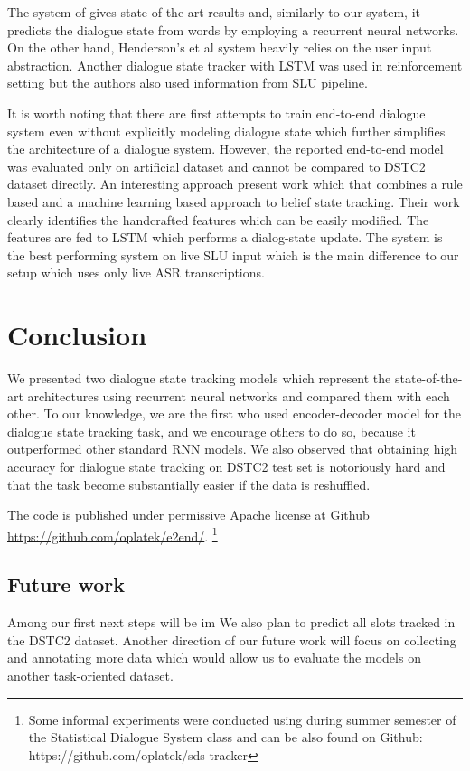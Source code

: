 \documentclass{itatnew}
\begin{document}
The system of \cite{henderson2014word} gives state-of-the-art results and, similarly to our system, it predicts the dialogue state from words by employing a recurrent neural networks.
On the other hand, Henderson's et al system heavily relies on the user input abstraction.
Another dialogue state tracker with LSTM was used in reinforcement setting but the authors also used information from SLU pipeline.\cite{lee2016dialog}

It is worth noting that there are first attempts to train end-to-end dialogue system even without explicitly modeling dialogue state\cite{bordes2016learning} which further simplifies the architecture of a dialogue system.
However, the reported end-to-end model was evaluated only on artificial dataset and cannot be compared to DSTC2 dataset directly.
An interesting approach present work\cite{vodolan2015hybrid} which that combines a rule based and a machine learning based approach to belief state tracking.
Their work clearly identifies the handcrafted features which can be easily modified. The features are fed to LSTM which performs a dialog-state update.
The system is the best performing system on live SLU input which is the main difference to our setup which uses only live ASR transcriptions.

\section{Conclusion}
\label{sec:conc}

We presented two dialogue state tracking models which represent the state-of-the-art architectures using recurrent neural networks and compared them with each other.
To our knowledge, we are the first who used encoder-decoder model for the dialogue state tracking task, and we encourage others to do so, because it outperformed other standard RNN models.
We also observed that obtaining high accuracy for dialogue state tracking on DSTC2 test set is notoriously hard and that the task become substantially easier if the data is reshuffled.

The code is published under permissive Apache license at Github \url{https://github.com/oplatek/e2end/}. \footnote{Some informal experiments were conducted using during summer semester of the Statistical Dialogue System class and can be also found on Github: https://github.com/oplatek/sds-tracker}
\subsection*{Future work}
Among our first next steps will be im
We also plan to predict all slots tracked in the DSTC2 dataset.
Another direction of our future work will focus on collecting and annotating more data which would allow us to evaluate the models on another task-oriented dataset.
\end{document}
